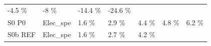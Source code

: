\documentclass[]{article}
\begin{document}
\begin{longtable}[]{@{}lllllll@{}}
\begin{minipage}[t]{0.11\columnwidth}
-4.5 \%\strut
\end{minipage} & \begin{minipage}[t]{0.11\columnwidth}\raggedright\strut
-8 \%\strut
\end{minipage} & \begin{minipage}[t]{0.11\columnwidth}\raggedright\strut
-14.4 \%\strut
\end{minipage} & \begin{minipage}[t]{0.11\columnwidth}\raggedright\strut
-24.6 \%\strut
\end{minipage}\tabularnewline
\begin{minipage}[t]{0.14\columnwidth}\raggedright\strut
S0 P0\strut
\end{minipage} & \begin{minipage}[t]{0.13\columnwidth}\raggedright\strut
Elec\_spe\strut
\end{minipage} & \begin{minipage}[t]{0.11\columnwidth}\raggedright\strut
1.6 \%\strut
\end{minipage} & \begin{minipage}[t]{0.11\columnwidth}\raggedright\strut
2.9 \%\strut
\end{minipage} & \begin{minipage}[t]{0.11\columnwidth}\raggedright\strut
4.4 \%\strut
\end{minipage} & \begin{minipage}[t]{0.11\columnwidth}\raggedright\strut
4.8 \%\strut
\end{minipage} & \begin{minipage}[t]{0.11\columnwidth}\raggedright\strut
6.2 \%\strut
\end{minipage}\tabularnewline
\begin{minipage}[t]{0.14\columnwidth}\raggedright\strut
S0b REF\strut
\end{minipage} & \begin{minipage}[t]{0.13\columnwidth}\raggedright\strut
Elec\_spe\strut
\end{minipage} & \begin{minipage}[t]{0.11\columnwidth}\raggedright\strut
1.6 \%\strut
\end{minipage} & \begin{minipage}[t]{0.11\columnwidth}\raggedright\strut
2.7 \%\strut
\end{minipage} & \begin{minipage}[t]{0.11\columnwidth}\raggedright\strut
4.2 \%\strut
\end{minipage} & \begin{minipage}[t]{0.11\columnwidth}\raggedright\strut

\end{minipage}
\end{longtable}
\end{document}
